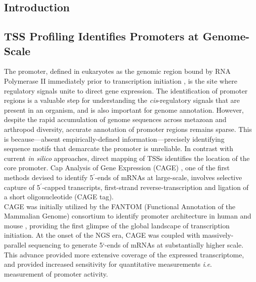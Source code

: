 \documentclass[runningheads,a4paper]{llncs}
\begin{document}
\begin{linenumbers}
\section{Introduction}

\subsection{TSS Profiling Identifies Promoters at Genome-Scale}
The promoter, defined in eukaryotes as the genomic region bound by RNA Polymerase II immediately prior to transcription initiation \cite{Kadonaga:2011gz}, is the site where regulatory signals unite to direct gene expression.
The identification of promoter regions is a valuable step for understanding the \textit{cis}-regulatory signals that are present in an organism, and is also important for genome annotation.
However, despite the rapid accumulation of genome sequences across metazoan and arthropod diversity, accurate annotation of promoter regions remains sparse. 
This is because---absent empirically-defined information---precisely identifying sequence motifs that demarcate the promoter is unreliable.
In contrast with current \textit{in silico} approaches, direct mapping of TSSs identifies the location of the core promoter.
Cap Analysis of Gene Expression (CAGE) \cite{Kodzius:2006gy}, one of the first methods devised to identify 5$^\prime$-ends of mRNAs at large-scale, involves selective capture of 5$^\prime$-capped transcripts, first-strand reverse-transcription and ligation of a short oligonucleotide (CAGE tag). \\
\indent
CAGE was initially utilized by the FANTOM (Functional Annotation of the Mammalian Genome) consortium to identify promoter architecture in human and mouse \cite{Carninci:2005kp}, providing the first glimpse of the global landscape of transcription initiation.
At the onset of the NGS era, CAGE was coupled with massively-parallel sequencing to generate 5`-ends of mRNAs at substantially higher scale. 
This advance provided more extensive coverage of the expressed transcriptome, and provided increased sensitivity for quantitative measurements \textit{i}.\textit{e}. measurement of promoter activity.


\end{linenumbers}
\end{document}
